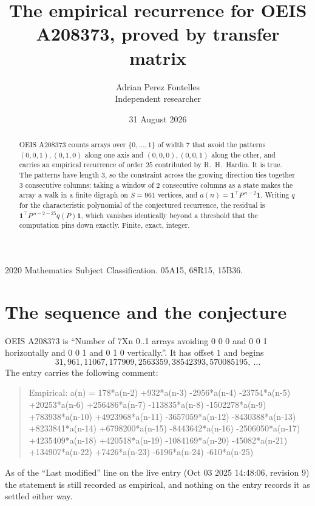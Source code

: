 \documentclass[11pt,a4paper]{article}
\title{The empirical recurrence for OEIS A208373, proved by transfer matrix}
\author{Adrian Perez Fontelles\\ \small Independent researcher}
\date{31 August 2026}
\theoremstyle{plain}
\theoremstyle{definition}
\begin{document}
\maketitle

\begin{abstract}
OEIS A208373 counts arrays over $\{0,\dots,1\}$ of width $7$ that avoid the patterns
$(0,0,1), (0,1,0)$ along one axis and $(0,0,0), (0,0,1)$ along the other, and carries an empirical recurrence of
order $25$ contributed by R.~H.~Hardin. It is true. The patterns have length $3$, so
the constraint across the growing direction ties together $3$ consecutive columns: taking a
window of $2$ consecutive columns as a state makes the array a walk in a finite digraph
on $S=961$ vertices, and $a(n)=\mathbf{1}^{\!\top}P^{\,n-2}\mathbf{1}$. Writing $q$
for the characteristic polynomial of the conjectured recurrence, the residual is
$\mathbf{1}^{\!\top}P^{\,n-2-25}q(P)\mathbf{1}$, which vanishes identically
beyond a threshold that the computation pins down exactly. Finite, exact, integer.
\end{abstract}

\noindent\small 2020 Mathematics Subject Classification. 05A15, 68R15, 15B36.\normalsize

\section{The sequence and the conjecture}

OEIS A208373 is ``Number of 7Xn 0..1 arrays avoiding 0 0 0 and 0 0 1 horizontally and 0 0 1 and 0 1 0 vertically.''. It has offset
$1$ and begins
\[
31, 961, 11067, 177909, 2563359, 38542393, 570085195,\ \dots
\]
The entry carries the following comment:
\begin{quote}\small
Empirical: a(n) = 178*a(n-2) +932*a(n-3) -2956*a(n-4) -23754*a(n-5) +20253*a(n-6) +256486*a(n-7) -113835*a(n-8) -1502278*a(n-9) +783938*a(n-10) +4923968*a(n-11) -3657059*a(n-12) -8430388*a(n-13) +8233841*a(n-14) +6798200*a(n-15) -8443642*a(n-16) -2506050*a(n-17) +4235409*a(n-18) +420518*a(n-19) -1084169*a(n-20) -45082*a(n-21) +134907*a(n-22) +7426*a(n-23) -6196*a(n-24) -610*a(n-25)
\end{quote}
As of the ``Last modified'' line on the live entry (Oct 03 2025 14:48:06, revision
9) the statement is still recorded as empirical, and nothing on the entry
records it as settled either way.
\end{document}
